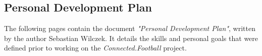 \patchcmd{\appendices}{\quad}{: }{}{}
\begin{appendices}

\section{Personal Development Plan}
\label{appendix:personal_development_plan}

The following pages contain the document \textit{"Personal Development Plan"}, written by the author Sebastian Wilczek. It details the skills and personal goals that were defined prior to working on the \textit{Connected.Football} project.



\end{appendices}